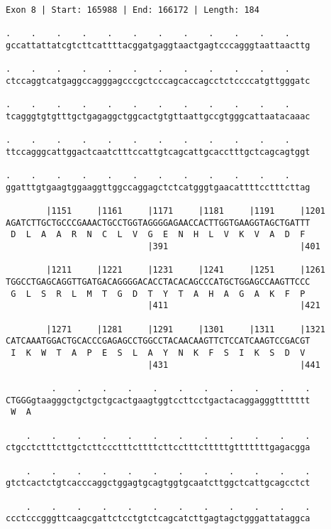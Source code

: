 \documentclass{article}
\begin{document}
\newpage
\begin{Verbatim}[fontfamily=courier]
Exon 8 | Start: 165988 | End: 166172 | Length: 184

.    .    .    .    .    .    .    .    .    .    .    .    
gccattattatcgtcttcattttacggatgaggtaactgagtcccagggtaattaacttg

.    .    .    .    .    .    .    .    .    .    .    .    
ctccaggtcatgaggccagggagcccgctcccagcaccagcctctccccatgttgggatc

.    .    .    .    .    .    .    .    .    .    .    .    
tcagggtgtgtttgctgagaggctggcactgtgttaattgccgtgggcattaatacaaac

.    .    .    .    .    .    .    .    .    .    .    .    
ttccagggcattggactcaatctttccattgtcagcattgcacctttgctcagcagtggt

.    .    .    .    .    .    .    .    .    .    .    .    
ggatttgtgaagtggaaggttggccaggagctctcatgggtgaacattttcctttcttag

        |1151     |1161     |1171     |1181     |1191     |1201
AGATCTTGCTGCCCGAAACTGCCTGGTAGGGGAGAACCACTTGGTGAAGGTAGCTGATTT
 D  L  A  A  R  N  C  L  V  G  E  N  H  L  V  K  V  A  D  F 
                            |391                          |401

        |1211     |1221     |1231     |1241     |1251     |1261
TGGCCTGAGCAGGTTGATGACAGGGGACACCTACACAGCCCATGCTGGAGCCAAGTTCCC
 G  L  S  R  L  M  T  G  D  T  Y  T  A  H  A  G  A  K  F  P 
                            |411                          |421

        |1271     |1281     |1291     |1301     |1311     |1321
CATCAAATGGACTGCACCCGAGAGCCTGGCCTACAACAAGTTCTCCATCAAGTCCGACGT
 I  K  W  T  A  P  E  S  L  A  Y  N  K  F  S  I  K  S  D  V 
                            |431                          |441

         .    .    .    .    .    .    .    .    .    .    .
CTGGGgtaagggctgctgctgcactgaagtggtccttcctgactacaggagggttttttt
 W  A                                                       

    .    .    .    .    .    .    .    .    .    .    .    .
ctgcctctttcttgctcttccctttcttttcttcctttctttttgtttttttgagacgga

    .    .    .    .    .    .    .    .    .    .    .    .
gtctcactctgtcacccaggctggagtgcagtggtgcaatcttggctcattgcagcctct

    .    .    .    .    .    .    .    .    .    .    .    .
ccctcccgggttcaagcgattctcctgtctcagcatcttgagtagctgggattataggca

\end{Verbatim}
\end{document}
